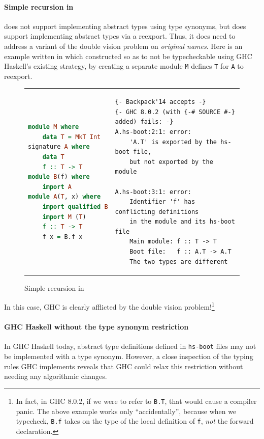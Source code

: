 \paragraph{Simple recursion in \OldBackpack{}}
\OldBackpack{} does not support implementing abstract types using type
synonyms, but does support implementing abstract types via a reexport.
Thus, it does need to address a variant of the double vision problem
on \emph{original names}.  Here is an example written in \OldBackpack{}
which constructed so as to not be typecheckable using GHC Haskell's existing strategy,
by creating a separate module \verb|M| defines \verb|T|
for \verb|A| to reexport.

\begin{figure}[H]
\begin{tabular}{p{} p{}}
\begin{lstlisting}[language=Haskell,escapechar=@]
module M where
    data T = MkT Int
signature A where
    data T
    f :: T -> T
module B(f) where
    import A
module A(T, x) where
    import qualified B
    import M (T)
    f :: T -> T
    f x = B.f x
\end{lstlisting}
&
\begin{verbatim}
{- Backpack'14 accepts -}
{- GHC 8.0.2 (with {-# SOURCE #-} added) fails: -}
A.hs-boot:2:1: error:
    'A.T' is exported by the hs-boot file,
    but not exported by the module

A.hs-boot:3:1: error:
    Identifier 'f' has conflicting definitions
    in the module and its hs-boot file
    Main module: f :: T -> T
    Boot file:   f :: A.T -> A.T
    The two types are different
\end{verbatim}
\end{tabular}
\caption{Simple recursion in \OldBackpack{}}
\label{fig:double-vision-simple-recursion-old-backpack}
\end{figure}

\noindent
In this case, GHC is clearly afflicted by the double vision
problem!\footnote{In fact, in GHC 8.0.2, if we were to refer to
\texttt{B.T}, that would cause a compiler panic.  The above example works
only ``accidentally'', because when we typecheck, \texttt{B.f} takes
on the type of the local definition of \texttt{f}, \emph{not} the
forward declaration.}

\paragraph{GHC Haskell without the type synonym restriction}
In GHC Haskell today, abstract type definitions defined in
\verb|hs-boot| files may not be implemented with a type synonym.
However, a close inspection of the typing rules GHC implements
reveals that GHC could relax this restriction without needing
any algorithmic changes.


